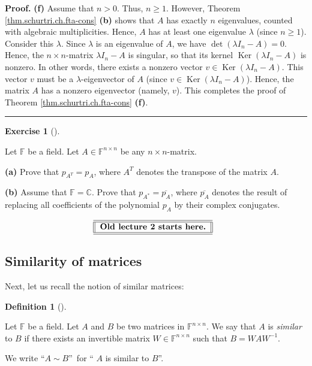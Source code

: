 \documentclass[numbers=enddot,12pt,final,onecolumn,notitlepage]{scrartcl}%
\newcounter{exer}
\numberwithin{exer}{subsection}
\theoremstyle{definition}
\newtheorem{defi}[theo]{Definition}
\newenvironment{definition}[1][]
{\begin{defi}[#1]\begin{leftbar}}
{\end{leftbar}\end{defi}}
\newtheorem{exmp}[exer]{Exercise}
\newenvironment{exercise}[1][]
{\begin{exmp}[#1]\begin{leftbar}}
{\end{leftbar}\end{exmp}}
\newenvironment{proof}[1][Proof]{\noindent\textbf{#1.} }{\ \rule{0.5em}{0.5em}}
\newenvironment{noncompile}{}{}
\begin{document}
\begin{proof}
\textbf{(f)} Assume that $n>0$. Thus, $n\geq1$. However, Theorem
\ref{thm.schurtri.ch.fta-cons} \textbf{(b)} shows that $A$ has exactly $n$
eigenvalues, counted with algebraic multiplicities. Hence, $A$ has at least
one eigenvalue $\lambda$ (since $n\geq1$). Consider this $\lambda$. Since
$\lambda$ is an eigenvalue of $A$, we have $\det\left(  \lambda I_{n}%
-A\right)  =0$. Hence, the $n\times n$-matrix $\lambda I_{n}-A$ is singular,
so that its kernel $\operatorname*{Ker}\left(  \lambda I_{n}-A\right)  $ is
nonzero. In other words, there exists a nonzero vector $v\in
\operatorname*{Ker}\left(  \lambda I_{n}-A\right)  $. This vector $v$ must be
a $\lambda$-eigenvector of $A$ (since $v\in\operatorname*{Ker}\left(  \lambda
I_{n}-A\right)  $). Hence, the matrix $A$ has a nonzero eigenvector (namely,
$v$). This completes the proof of Theorem \ref{thm.schurtri.ch.fta-cons}
\textbf{(f)}.
\end{proof}

\begin{exercise}
 Let $\mathbb{F}$ be a field. Let $A\in\mathbb{F}^{n\times n}$ be any
$n\times n$-matrix. \medskip

\textbf{(a)} Prove that $p_{A^{T}}=p_{A}$, where $A^{T}$ denotes the transpose
of the matrix $A$. \medskip

\textbf{(b)} Assume that $\mathbb{F}=\mathbb{C}$. Prove that $p_{A^{\ast}%
}=\overline{p_{A}}$, where $\overline{p_{A}}$ denotes the result of replacing
all coefficients of the polynomial $p_{A}$ by their complex conjugates.
\end{exercise}

\begin{noncompile}%
\[%
\begin{tabular}
[c]{||l||}\hline\hline
\textbf{Old lecture 2 starts here.}\\\hline\hline
\end{tabular}
\ \
\]

\end{noncompile}

\subsection{\label{sec.schur.similar}Similarity of matrices}

Next, let us recall the notion of similar matrices:

\begin{definition}
\label{def.schurtri.similar.def}Let $\mathbb{F}$ be a field. Let $A$ and $B$
be two matrices in $\mathbb{F}^{n\times n}$. We say that $A$ is \emph{similar}
to $B$ if there exists an invertible matrix $W\in\mathbb{F}^{n\times n}$ such
that $B=WAW^{-1}$.

We write \textquotedblleft$A\sim B$\textquotedblright\ for \textquotedblleft%
$A$ is similar to $B$\textquotedblright.
\end{definition}
\end{document}
